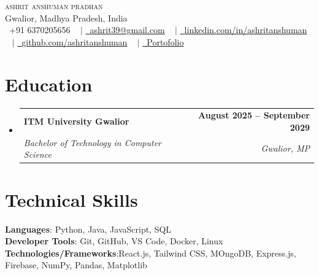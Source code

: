 \documentclass[letterpaper,11pt]{article}
\makeatletter
\newcommand{\resumeSubheading}[4]{
  \vspace{-2pt}\item
    \begin{tabular*}{1.0\textwidth}[t]{l@{\extracolsep{\fill}}r}
      {\fontsize{12pt}{14pt}\selectfont\bfseries #1} &
      {\fontsize{12pt}{14pt}\selectfont\bfseries\sffamily #2} \\
      {\fontsize{10pt}{12pt}\selectfont\itshape #3} &
      {\fontsize{10pt}{12pt}\selectfont\itshape #4} \\
    \end{tabular*}\vspace{-7pt}
}
\newcommand{\resumeSubHeadingListStart}{\begin{itemize}[leftmargin=0.0in, label={}]}
\newcommand{\resumeSubHeadingListEnd}{\end{itemize}}
\makeatother
\begin{document}

\begin{center}
{\selectfont
    {\Huge \scshape ashrit anshuman pradhan} \\ \vspace{1pt}
    Gwalior, Madhya Pradesh, India \\ \vspace{1pt}
    \small \raisebox{-0.1\height}\ +91 6370205656 ~ $|$
    \href{mailto:ashrit39@gmail.com}{\raisebox{-0.2\height}\ {ashrit39@gmail.com}} ~ $|$
    \href{https://linkedin.com/in/ashritanshuman/}{\raisebox{-0.2\height}\ {linkedin.com/in/ashritanshuman}} ~ $|$
    \href{https://github.com/ashritanshuman}{\raisebox{-0.2\height}\ {github.com/ashritanshuman}} ~ $|$
    \href{https://ashritanshuman.vercel.app}{\raisebox{-0.2\height}\ {Portofolio}} 
}
\vspace{-8pt}
\end{center}


\section{Education}
  \resumeSubHeadingListStart
    \resumeSubheading
      {ITM University Gwalior}{August 2025 -- September 2029}
      {Bachelor of Technology in Computer Science}{Gwalior, MP}
  \resumeSubHeadingListEnd

\section{Technical Skills}
 \begin{itemize}[leftmargin=0.15in, label={}]
    \small{\item{
     \textbf{Languages}{: Python, Java, JavaScript, SQL} \\
     \textbf{Developer Tools}{: Git, GitHub, VS Code, Docker, Linux} \\
     \textbf{Technologies/Frameworks}{:React.js, Tailwind CSS, MOngoDB, Express.js, Firebase, NumPy, Pandas, Matplotlib} \\
    }}
 \end{itemize}
 \vspace{-16pt}
\end{document}

